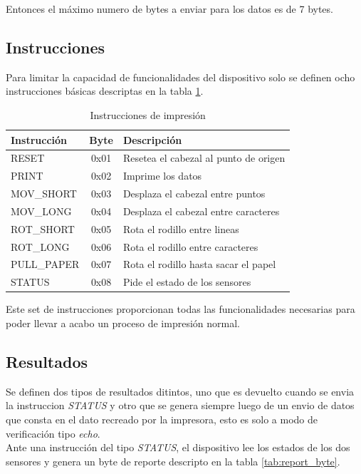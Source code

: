 Entonces el m\'aximo numero de bytes a enviar para los datos es de 7 bytes. 

\subsection{Instrucciones}
%
Para limitar la capacidad de funcionalidades del dispositivo solo se
definen ocho instrucciones b\'asicas descriptas en la tabla
\ref{tab:instructions_set}.

\begin{table}[ht]
\centering
\begin{tabular}{|l|c|l|} 												\hline
\rowcolor[gray]{.9}
Instrucci\'on & Byte & Descripci\'on 								\\ 	\hline
RESET 		&	0x01	&	Resetea el cabezal	al punto de origen	\\	\hline
PRINT 		&	0x02	&	Imprime los datos						\\	\hline
MOV\_SHORT 	&  	0x03	&	Desplaza el cabezal entre puntos		\\	\hline
MOV\_LONG  	&  	0x04	&	Desplaza el cabezal entre caracteres	\\	\hline
ROT\_SHORT 	&	0x05	&	Rota el rodillo entre lineas			\\	\hline
ROT\_LONG   &	0x06	&	Rota el rodillo entre caracteres		\\	\hline
PULL\_PAPER	&	0x07	&	Rota el rodillo hasta sacar el papel	\\	\hline
STATUS		&	0x08	&	Pide el estado de los sensores			\\	\hline
\end{tabular}
\caption{Instrucciones de impresi\'on} 
\label{tab:instructions_set}
\end{table}

Este set de instrucciones proporcionan todas las funcionalidades necesarias
para poder llevar a acabo un proceso de impresi\'on normal.

\subsection{Resultados}
%
Se definen dos tipos de resultados ditintos, uno que es devuelto cuando se
envia la instruccion \emph{STATUS} y otro que se genera siempre luego de un
envio de datos que consta en el dato recreado por la impresora, esto es solo a
modo de verificaci\'on tipo \emph{echo}.\\

Ante una instrucci\'on del tipo \emph{STATUS}, el dispositivo lee los estados
de los dos sensores y genera un byte de reporte descripto en la tabla
\ref{tab:report_byte}.


